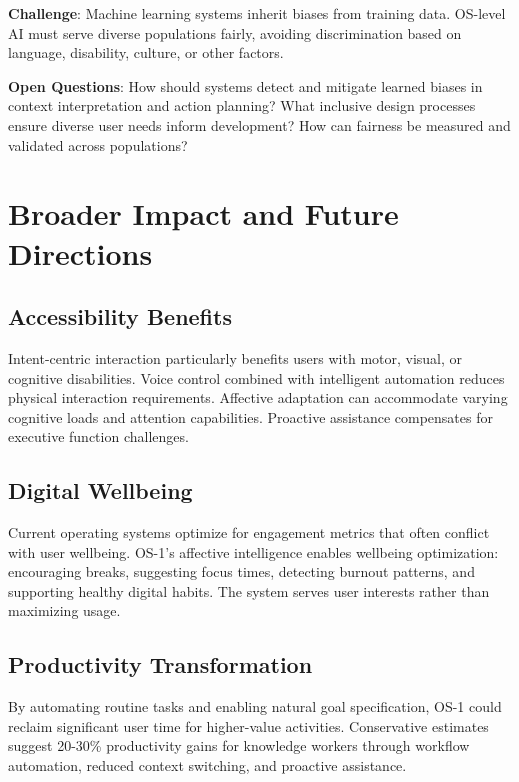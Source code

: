 \documentclass[conference]{IEEEtran}
\begin{document}
\textbf{Challenge}: Machine learning systems inherit biases from training data. OS-level AI must serve diverse populations fairly, avoiding discrimination based on language, disability, culture, or other factors.

\textbf{Open Questions}: How should systems detect and mitigate learned biases in context interpretation and action planning? What inclusive design processes ensure diverse user needs inform development? How can fairness be measured and validated across populations?

\section{Broader Impact and Future Directions}

\subsection{Accessibility Benefits}

Intent-centric interaction particularly benefits users with motor, visual, or cognitive disabilities. Voice control combined with intelligent automation reduces physical interaction requirements. Affective adaptation can accommodate varying cognitive loads and attention capabilities. Proactive assistance compensates for executive function challenges.

\subsection{Digital Wellbeing}

Current operating systems optimize for engagement metrics that often conflict with user wellbeing. OS-1's affective intelligence enables wellbeing optimization: encouraging breaks, suggesting focus times, detecting burnout patterns, and supporting healthy digital habits. The system serves user interests rather than maximizing usage.

\subsection{Productivity Transformation}

By automating routine tasks and enabling natural goal specification, OS-1 could reclaim significant user time for higher-value activities. Conservative estimates suggest 20-30\% productivity gains for knowledge workers through workflow automation, reduced context switching, and proactive assistance.
\end{document}
